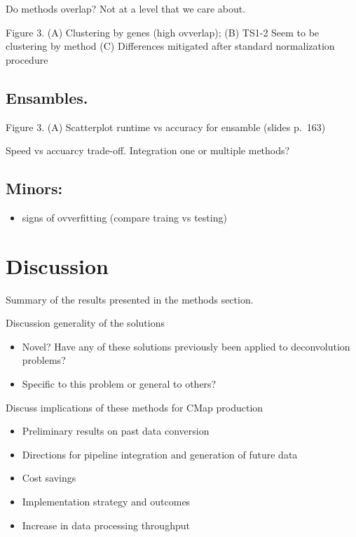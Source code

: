 \documentclass[]{article}
\providecommand{\tightlist}{%
  \setlength{\itemsep}{0pt}\setlength{\parskip}{0pt}}
\begin{document}
Do methods overlap? Not at a level that we care about.

Figure 3. (A) Clustering by genes (high ovverlap); (B) TS1-2 Seem to be
clustering by method (C) Differences mitigated after standard
normalization procedure

\hypertarget{ensambles.}{%
\subsection{Ensambles.}\label{ensambles.}}

Figure 3. (A) Scatterplot runtime vs accuracy for ensamble (slides
p.~163)

Speed vs accuarcy trade-off. Integration one or multiple methods?

\hypertarget{minors}{%
\subsection{Minors:}\label{minors}}

\begin{itemize}
\tightlist
\item
  signs of ovverfitting (compare traing vs testing)
\end{itemize}

\hypertarget{discussion}{%
\section{Discussion}\label{discussion}}

Summary of the results presented in the methods section.

Discussion generality of the solutions

\begin{itemize}
\tightlist
\item
  Novel? Have any of these solutions previously been applied to
  deconvolution problems?
\item
  Specific to this problem or general to others?
\end{itemize}

Discuss implications of these methods for CMap production

\begin{itemize}
\tightlist
\item
  Preliminary results on past data conversion
\item
  Directions for pipeline integration and generation of future data
\item
  Cost savings
\item
  Implementation strategy and outcomes
\item
  Increase in data processing throughput
\end{itemize}
\end{document}
